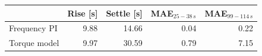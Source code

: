 \begin{tabular}{@{}lrrrr@{}}\toprule
 & Rise [s] & Settle [s] & MAE$_{25-38\,s}$ & MAE$_{99-114\,s}$\\\midrule
Frequency PI & 9.88 & 14.66 & 0.04 & 0.22 \\
Torque model & 9.97 & 30.59 & 0.79 & 7.15 \\
\bottomrule\end{tabular}
